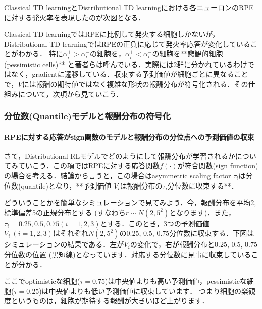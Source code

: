 Classical TD learningとDistributional TD learningにおける各ニューロンのRPEに対する発火率を表現したのが次図となる．



Classical TD learningではRPEに比例して発火する細胞しかないが，Distributional TD learningではRPEの正負に応じて発火率応答が変化していることがわかる． 特に$\alpha_{i}^{+} \gt \alpha_{i}^{-}$の細胞を\textbf{}，$\alpha_{i}^{+}\lt
\alpha_{i}^{-}$の細胞を**悲観的細胞 (pessimistic
cells)** と著者らは呼んでいる．実際には2群に分かれているわけではなく，gradientに遷移している．収束する予測価値が細胞ごとに異なることで，$V$には報酬の期待値ではなく複雑な形状の報酬分布が符号化される．その仕組みについて，次項から見ていこう．
\subsubsection{分位数(Quantile)モデルと報酬分布の符号化}

\paragraph{RPEに対する応答がsign関数のモデルと報酬分布の分位点への予測価値の収束}
さて，Distributional RLモデルでどのようにして報酬分布が学習されるかについてみていこう．この項ではRPEに対する応答関数$f(\cdot)$が符合関数(sign function)の場合を考える．結論から言うと，この場合はasymmetric scaling factor $\tau_i$は分位数(quantile)となり，**予測価値
$V_i$は報酬分布の$\tau_i$分位数に収束する**．
    
どういうことかを簡単なシミュレーションで見てみよう．今，報酬分布を平均2, 標準偏差5の正規分布とする (すなわち$r \sim N(2, 5^2)$となります)．また，$\tau_i = 0.25, 0.5, 0.75 (i=1,2,3)$とする．このとき，3つの予測価値 $V_i \ (i=1,2,3)$はそれぞれ$N(2, 5^2)$の0.25, 0.5,
0.75分位数に収束する．下図はシミュレーションの結果である．左が$V_i$の変化で，右が報酬分布と0.25, 0.5, 0.75分位数の位置 (黒短線)となっています．対応する分位数に見事に収束していることが分かる．








ここでoptimisticな細胞($\tau=0.75$)は中央値よりも高い予測価値，pessimisticな細胞($\tau=0.25$)は中央値よりも低い予測価値に収束しています． つまり細胞の楽観度というものは，細胞が期待する報酬が大きいほど上がります．

